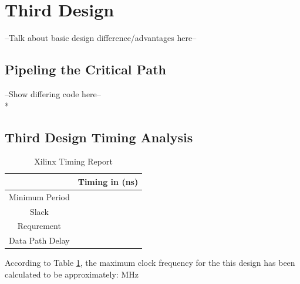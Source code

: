\section*{Third Design}
--Talk about basic design difference/advantages here-- 

\subsection*{Pipeling the Critical Path}
--Show differing code here-- \\*



\subsection*{Third Design Timing Analysis}

\begin{table}[bh]
\caption{Xilinx Timing Report}
\begin{tabular}{c|c}
\centering
           & Timing in (ns) \\
\hline
Minimum Period &     \\

     Slack &     \\

Requrement &        \\

Data Path Delay &     \\
\end{tabular}  
\label{tab:timing3}
\end{table}

According to Table \ref{tab:timing3}, the maximum clock frequency for the this design has been calculated to be approximately:  MHz



